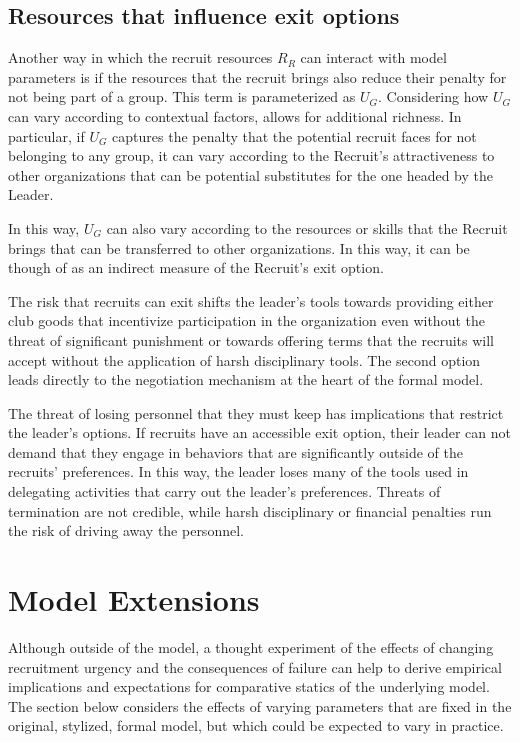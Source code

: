 \subsection{Resources that influence exit options}
Another way in which the recruit resources $R_{R}$ can interact with model parameters is if the resources that the recruit brings also reduce their penalty for not being part of a group. This term is parameterized as $U_{G}$. Considering how $U_{G}$ can vary according to contextual factors, allows for additional richness. In particular, if $U_{G}$ captures the penalty that the potential recruit faces for not belonging to any group, it can vary according to the Recruit's attractiveness to other organizations that can be potential substitutes for the one headed by the Leader.

In this way, $U_{G}$ can also vary according to the resources or skills that the Recruit brings that can be transferred to other organizations. In this way, it can be though of as an indirect measure of the Recruit's exit option.

The risk that recruits can exit shifts the leader’s tools towards providing either club goods that incentivize participation in the organization even without the threat of significant punishment or towards offering terms that the recruits will accept without the application of harsh disciplinary tools. The second option leads directly to the negotiation mechanism at the heart of the formal model.

The threat of losing personnel that they must keep has implications that restrict the leader’s options. If recruits have an accessible exit option, their leader can not demand that they engage in behaviors that are significantly outside of the recruits’ preferences. In this way, the leader loses many of the tools used in delegating activities that carry out the leader’s preferences. Threats of termination are not credible, while harsh disciplinary or financial penalties run the risk of driving away the personnel.  %

\section{Model Extensions}

Although outside of the model, a thought experiment of the effects of changing recruitment urgency and the consequences of failure can help to derive empirical implications and expectations for comparative statics of the underlying model. The section below considers the effects of varying parameters that are fixed in the original, stylized, formal model, but which could be expected to vary in practice. 


